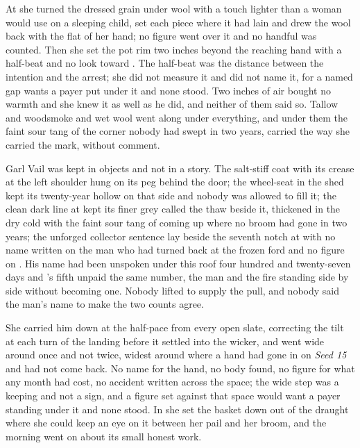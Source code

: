 At  she turned the dressed grain under wool with a touch lighter than a woman would use on a sleeping child, set each piece where it had lain and drew the wool back with the flat of her hand; no figure went over it and no handful was counted. Then she set the pot rim two inches beyond the reaching hand with a half-beat and no look toward . The half-beat was the distance between the intention and the arrest; she did not measure it and did not name it, for a named gap wants a payer put under it and none stood. Two inches of air bought no warmth and she knew it as well as he did, and neither of them said so. Tallow and woodsmoke and wet wool went along under everything, and under them the faint sour tang of the corner nobody had swept in two years, carried the way she carried the mark, without comment.

Garl Vail was kept in objects and not in a story. The salt-stiff coat with its crease at the left shoulder hung on its peg behind the door; the wheel-seat in the shed kept its twenty-year hollow on that side and nobody was allowed to fill it; the clean dark line at  kept its finer grey called the thaw beside it, thickened in the dry cold with the faint sour tang of  coming up where no broom had gone in two years; the unforged collector sentence lay beside the seventh notch at  with no name written on the man who had turned back at the frozen ford and no figure on . His name had been unspoken under this roof four hundred and twenty-seven days and 's fifth unpaid the same number, the man and the fire standing side by side without becoming one. Nobody lifted  to supply the pull, and nobody said the man's name to make the two counts agree.

She carried him down  at the half-pace from every open slate, correcting the tilt at each turn of the landing before it settled into the wicker, and went wide around  once and not twice, widest around  where a hand had gone in on \emph{Seed 15} and had not come back. No name for the hand, no body found, no figure for what any month had cost, no accident written across the space; the wide step was a keeping and not a sign, and a figure set against that space would want a payer standing under it and none stood. In  she set the basket down out of the draught where she could keep an eye on it between her pail and her broom, and the morning went on about its small honest work.

